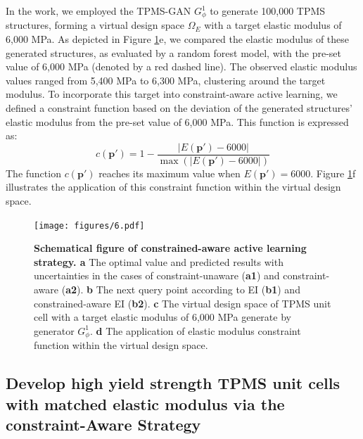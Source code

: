 \documentclass[preprint,review,12pt,authoryear]{elsarticle}
\begin{document}
In  the work, we employed the TPMS-GAN $G_\phi^1$ to generate 100,000 TPMS structures, forming a virtual design space $\Omega_E$ with a target elastic modulus of 6,000 MPa. As depicted in Figure \ref{fig:6}e, we compared the elastic modulus of these generated structures, as evaluated by a random forest model, with the pre-set value of 6,000 MPa (denoted by a red dashed line). The observed elastic modulus values ranged from 5,400 MPa to 6,300 MPa, clustering around the target modulus. To incorporate this target into constraint-aware active learning, we defined a constraint function based on the deviation of the generated structures' elastic modulus from the pre-set value of 6,000 MPa. This function is expressed as:
\begin{equation}
    c(\boldsymbol{p}') = 1 - \frac{|E(\boldsymbol{p}') - 6000|}{\max(|E(\boldsymbol{p}') - 6000|)}
\label{eq:22}
\end{equation}
The function $c(\boldsymbol{p}')$ reaches its maximum value when $E(\boldsymbol{p}') = 6000$. Figure \ref{fig:6}f illustrates the application of this constraint function within the virtual design space.

\begin{figure}
    \centering
    \texttt{[image: figures/6.pdf]}
    \caption{\textbf{Schematical figure of constrained-aware active learning strategy. a} The optimal value and predicted results with uncertainties in the cases of constraint-unaware (\textbf{a1}) and constraint-aware (\textbf{a2}). \textbf{b} The next query point according to EI (\textbf{b1}) and constrained-aware EI (\textbf{b2}). \textbf{c} The virtual design space of TPMS unit cell with a target elastic modulus of 6,000 MPa generate by generator $G_\phi^1$. \textbf{d} The application of elastic modulus constraint function within the virtual design space.}
    \label{fig:6}
\end{figure}

\subsection{Develop high yield strength TPMS unit cells with matched elastic modulus via the constraint-Aware Strategy}
\end{document}
